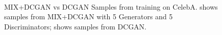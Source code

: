 \documentclass{article}
\begin{document}
\begin{figure}[!htb]%
  \centering
  \hspace{8pt}%
  \\
  \caption{MIX+DCGAN vs DCGAN Samples from training on CelebA. \protect{} shows samples from MIX+DCGAN with 5 Generators and 5 Discriminators; \protect{} shows samples from DCGAN.}
  \label{fig:ex3}%
\end{figure}
\end{document}
